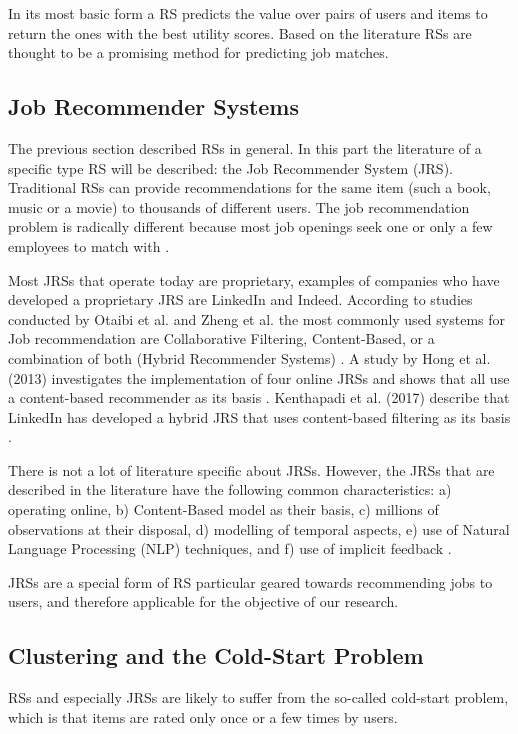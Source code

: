 In its most basic form a RS predicts the value over pairs of users and items to return the ones with the best utility scores.
Based on the literature RSs are thought to be a promising method for predicting job matches.

\subsection{Job Recommender Systems}
\label{sec:jrs}
The previous section described RSs in general. 
In this part the literature of a specific type RS will be described: the Job Recommender System (JRS).
Traditional RSs can provide recommendations for the same item (such a book, music or a movie) to thousands of different users.
The job recommendation problem is radically different because most job openings seek one or only a few employees to match with \cite{kenthapadi2017personalized}.

Most JRSs that operate today are proprietary, examples of companies who have developed a proprietary JRS are LinkedIn and Indeed.
According to studies conducted by Otaibi et al. and Zheng et al. the most commonly used  systems for Job recommendation are Collaborative Filtering, Content-Based, or a combination of both (Hybrid Recommender Systems) \cite{T.Al-Otaibi2012ASystems, Zheng2012JobSurvey}.
A study by Hong et al. (2013) investigates the implementation of four online JRSs and shows that all use a content-based recommender as its basis \cite{hong2013job}.
Kenthapadi et al. (2017) describe that LinkedIn has developed a hybrid JRS that uses content-based filtering as its basis \cite{kenthapadi2017personalized}.

There is not a lot of literature specific about JRSs. 
However, the JRSs that are described in the literature have the following common characteristics: a) operating online, b) Content-Based model as their basis, c) millions of observations at their disposal, d) modelling of temporal aspects, e) use of Natural Language Processing (NLP) techniques, and f) use of implicit feedback \cite{kenthapadi2017personalized, T.Al-Otaibi2012ASystems, Zheng2012JobSurvey, hong2013job}.

JRSs are a special form of RS particular geared towards recommending jobs to users, and therefore applicable for the objective of our research.

\subsection{Clustering and the Cold-Start Problem}
\label{sec:ccs}
RSs and especially JRSs are likely to suffer from the so-called cold-start problem, which is that items are rated only once or a few times by users.

